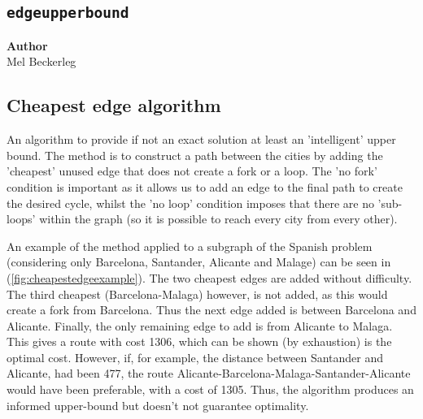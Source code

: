 \subsection{\texttt{edgeupperbound}}
\label{subsec:degeupperbound}

\begin{flushright}
\textbf{Author} \\
Mel Beckerleg
\end{flushright}

\subsection{Cheapest edge algorithm}

An algorithm to provide if not an exact solution at least an 'intelligent' upper bound. The method is to construct a path between the cities by adding the 'cheapest' unused edge that does not create a fork or a loop. The 'no fork' condition is important as it allows us to add an edge to the final path to create the desired cycle, whilst the 'no loop' condition imposes that there are no 'sub-loops' within the graph (so it is possible to reach every city from every other). 

An example of the method applied to a subgraph of the Spanish problem (considering only Barcelona, Santander, Alicante and Malage) can be seen in (\ref{fig:cheapestedgeexample}). The two cheapest edges are added without difficulty. The third cheapest (Barcelona-Malaga) however, is not added, as this would create a fork from Barcelona. Thus the next edge added is between Barcelona and Alicante. Finally, the only remaining edge to add is from Alicante to Malaga. This gives a route with cost 1306, which can be shown (by exhaustion) is the optimal cost. However, if, for example, the distance between Santander and Alicante, had been 477, the route Alicante-Barcelona-Malaga-Santander-Alicante would have been preferable, with a cost of 1305. Thus, the algorithm produces an informed upper-bound but doesn't not guarantee optimality. 

